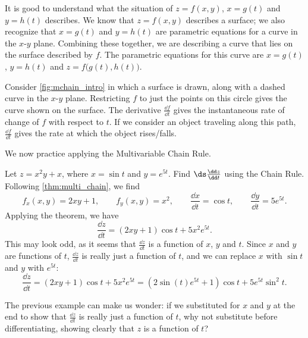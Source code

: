 It is good to understand what the situation of $z=f(x,y)$, $x=g(t)$ and $y=h(t)$ describes. We know that $z=f(x,y)$ describes a surface; we also recognize that $x=g(t)$ and $y=h(t)$ are parametric equations for a curve in the $x$-$y$ plane. Combining these together, we are describing a curve that lies on the surface described by $f$. The parametric equations for this curve are $x=g(t)$, $y=h(t)$ and $z=f\bigl(g(t),h(t)\bigr)$.


Consider \autoref{fig:mchain_intro} in which a surface is drawn, along with a dashed curve in the $x$-$y$ plane. Restricting $f$ to just the points on this circle gives the curve shown on the surface. The derivative $\frac{\dd f}{\dd t}$ gives the instantaneous rate of change of $f$ with respect to $t$. If we consider an object traveling along this path, $\frac{\dd f}{\dd t}$ gives the rate at which the object rises/falls.

We now practice applying the Multivariable Chain Rule.

\begin{example}\label{ex_mchain1}
Let $z=x^2y+x$, where $x=\sin t$ and $y=e^{5t}$. Find $\ds \frac{\dd z}{\dd t}$ using the Chain Rule.
\solution
Following \autoref{thm:multi_chain}, we find
\[f_x(x,y) = 2xy+1,\qquad f_y(x,y) = x^2,\qquad \frac{\dd x}{\dd t} = \cos t,\qquad \frac{\dd y}{\dd t}= 5e^{5t}.\]
Applying the theorem, we have
\[\frac{\dd z}{\dd t} = (2xy+1)\cos t+ 5x^2e^{5t}.\]
This may look odd, as it seems that $\frac{\dd z}{\dd t}$ is a function of $x$, $y$ and $t$. Since $x$ and $y$ are functions of $t$, $\frac{\dd z}{\dd t}$ is really just a function of $t$, and we can replace $x$ with $\sin t$ and $y$ with $e^{5t}$:
\[\frac{\dd z}{\dd t} = (2xy+1)\cos t+ 5x^2e^{5t} = (2\sin (t)e^{5t}+1)\cos t+5e^{5t}\sin^2t.\]
\end{example}

The previous example can make us wonder: if we substituted for $x$ and $y$ at the end to show that $\frac{\dd z}{\dd t}$ is really just a function of $t$, why not substitute before differentiating, showing clearly that $z$ is a function of $t$?

